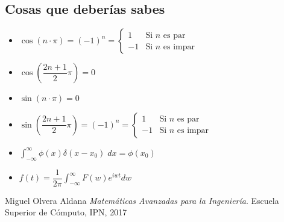 \documentclass[12pt, fleqn]{report}                             %
\theoremstyle{break}                                            %
\newcommand{\Wrap}[1]           {\left( #1 \right)}             %
\newcommand{\Cos}[1] {\cos\Wrap{#1}}                            %
\newcommand{\Sin}[1] {\sin\Wrap{#1}}                            %
\begin{document}
            \clearpage
            \subsection*{Cosas que deberías sabes}
                \begin{itemize}
                    \item
                        $
                            \Cos{n \cdot \pi} 
                            =
                            (-1)^n  
                            =
                            \begin{cases}
                                1 & \text{Si $n$ es par}      \\
                                -1 & \text{Si $n$ es impar}
                            \end{cases} 
                        $                        

                    \item $\Cos{\dfrac{2n+1}{2} \pi } = 0$

                    \item $\Sin{n \cdot \pi} = 0$

                    \item
                        $
                            \Sin{\dfrac{2n+1}{2} \pi }
                            =
                            (-1)^n  
                            =
                            \begin{cases}
                                1 & \text{Si $n$ es par}      \\
                                -1 & \text{Si $n$ es impar}
                            \end{cases}
                        $
                    \item $\displaystyle \int_{-\infty}^\infty \phi(x) \delta(x-x_0) \; dx = \phi(x_0)$
                    \item $f(t) = \dfrac{1}{2\pi} \int_{-\infty}^\infty F(w) e^{iw t} dw$
                \end{itemize}







\begin{thebibliography}{10}

        Miguel Olvera Aldana
        \textit{Matemáticas Avanzadas para la Ingeniería}. 
        Escuela Superior de Cómputo, IPN, 2017

\end{thebibliography}
\end{document}
